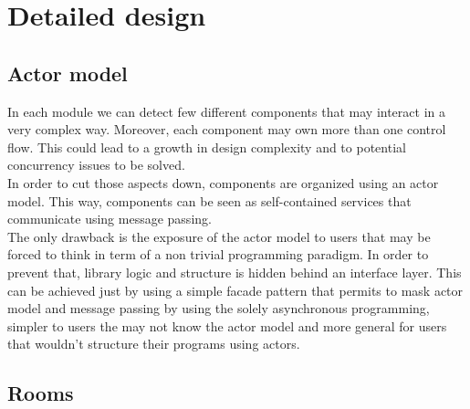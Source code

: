 \chapter{Detailed design}

\section{Actor model}

In each module we can detect few different components that may interact in a very complex way. Moreover, each component may own more than one control flow. This could lead to a growth in design complexity and to potential concurrency issues to be solved.
\\
In order to cut those aspects down, components are organized using an actor model. This way, components can be seen as self-contained services that communicate using message passing.
\\
The only drawback is the exposure of the actor model to users that may be forced to think in term of a non trivial programming paradigm. In order to prevent that, library logic and structure is hidden behind an interface layer. This can be achieved just by using a simple facade pattern that permits to mask actor model and message passing by using the solely asynchronous programming, simpler to users the may not know the actor model and more general for users that wouldn't structure their programs using actors.

\section{Rooms}

